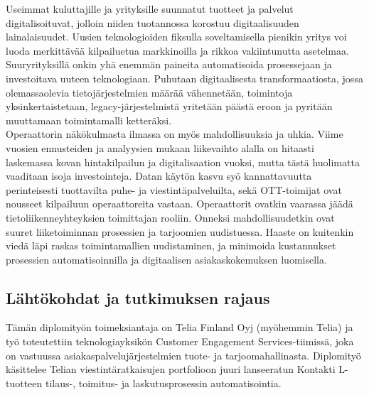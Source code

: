 \documentclass[finnish,12pt,a4paper,pdftex]{article}
\begin{document}
Useimmat kuluttajille ja yrityksille suunnatut tuotteet ja palvelut digitalisoituvat, jolloin niiden tuotannossa korostuu digitaalisuuden lainalaisuudet. Uusien teknologioiden fiksulla soveltamisella pienikin yritys voi luoda merkittävää kilpailuetua markkinoilla ja rikkoa vakiintunutta asetelmaa. 
Suuryrityksillä onkin yhä enemmän paineita automatisoida prosessejaan ja investoitava uuteen teknologiaan. Puhutaan digitaalisesta transformaatiosta, jossa olemassaolevia tietojärjestelmien määrää vähennetään, toimintoja yksinkertaistetaan, legacy-järjestelmistä yritetään päästä eroon ja pyritään muuttamaan toimintamalli ketteräksi. \citep{lamoureux} \\


Operaattorin näkökulmasta ilmassa on myös mahdollisuuksia ja uhkia. 
Viime vuosien ennusteiden ja analyysien mukaan liikevaihto alalla on hitaasti laskemassa kovan hintakilpailun ja digitalisaation vuoksi, mutta tästä huolimatta vaaditaan isoja investointeja.
Datan käytön kasvu syö kannattavuutta perinteisesti tuottavilta puhe- ja viestintäpalveluilta, sekä OTT-toimijat ovat nousseet kilpailuun operaattoreita vastaan. Operaattorit ovatkin vaarassa jäädä tietoliikenneyhteyksien toimittajan rooliin. Onneksi mahdollisuudetkin ovat suuret liiketoiminnan prosessien ja tarjoomien uudistuessa. Haaste on kuitenkin viedä läpi raskas toimintamallien uudistaminen, ja minimoida kustannukset prosessien automatisoinnilla ja digitaalisen asiakaskokemuksen luomisella. \citep{mckinseytele}

\subsection{Lähtökohdat ja tutkimuksen rajaus}

Tämän diplomityön toimeksiantaja on Telia Finland Oyj (myöhemmin Telia) ja työ toteutettiin teknologiayksikön Customer Engagement Services-tiimissä, joka on vastuussa asiakaspalvelujärjestelmien tuote- ja tarjoomahallinasta. Diplomityö käsittelee Telian viestintäratkaisujen portfolioon juuri lanseeratun Kontakti L-tuotteen tilaus-, toimitus- ja laskutusprosessin automatisointia.\\
\end{document}
